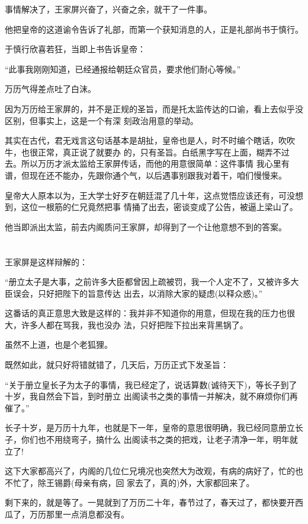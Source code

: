 \documentclass[11pt,a4paper,onecolumn]{article}
\begin{document}
事情解决了，王家屏兴奋了，兴奋之余，就干了一件事。

他把皇帝的这道谕令告诉了礼部，而第一个获知消息的人，正是礼部尚书于慎行。

于慎行欣喜若狂，当即上书告诉皇帝：

``此事我刚刚知道，已经通报给朝廷众官员，要求他们耐心等候。''

万历气得差点吐了白沫。

因为万历给王家屏的，并不是正规的圣旨，而是托太监传达的口谕，看上去似乎没区别，但事实上，这是一个有深
刻政治用意的举动。

其实在古代，君无戏言这句话基本是胡扯，皇帝也是人，时不时编个瞎话，吹吹牛，也很正常，真正说了就要办
的，只有圣旨。白纸黑字写在上面，糊弄不过去。所以万历才派太监给王家屏传话，而他的用意很简单：这件事情
我心里有谱，但现在还不能办，先跟你通个气，以后遇事别跟我对着干，咱们慢慢来。

皇帝大人原本以为，王大学士好歹在朝廷混了几十年，这点觉悟应该还有，可没想到，这位一根筋的仁兄竟然把事
情捅了出去，密谈变成了公告，被逼上梁山了。

他当即派出太监，前去内阁质问王家屏，却得到了一个让他意想不到的答案。

\section[\thesection]{}

王家屏是这样辩解的：

``册立太子是大事，之前许多大臣都曾因上疏被罚，我一个人定不了，又被许多大臣误会，只好把陛下的旨意传达
出去，以消除大家的疑虑(以释众惑)。''

这番话的真正意思大致是这样的：我并非不知道你的用意，但现在我的压力也很大，许多人都在骂我，我也没办
法，只好把陛下拉出来背黑锅了。

虽然不上道，也是个老狐狸。

既然如此，就只好将错就错了，几天后，万历正式下发圣旨：

``关于册立皇长子为太子的事情，我已经定了，说话算数(诚待天下)，等长子到了十岁，我自然会下旨，到时册立
出阁读书之类的事情一并解决，就不麻烦你们再催了。''

长子十岁，是万历十九年，也就是下一年，皇帝的意思很明确，我已经同意册立长子，你们也不用绕弯子，搞什么
出阁读书之类的把戏，让老子清净一年，明年就立了!

这下大家都高兴了，内阁的几位仁兄境况也突然大为改观，有病的病好了，忙的也不忙了，除王锡爵(母亲有病，回
家去了，真的)外，大家都回来了。

剩下来的，就是等了。一晃就到了万历二十年，春节过了，春天过了，都快要开西瓜了，万历那里一点消息都没有。
\end{document}
